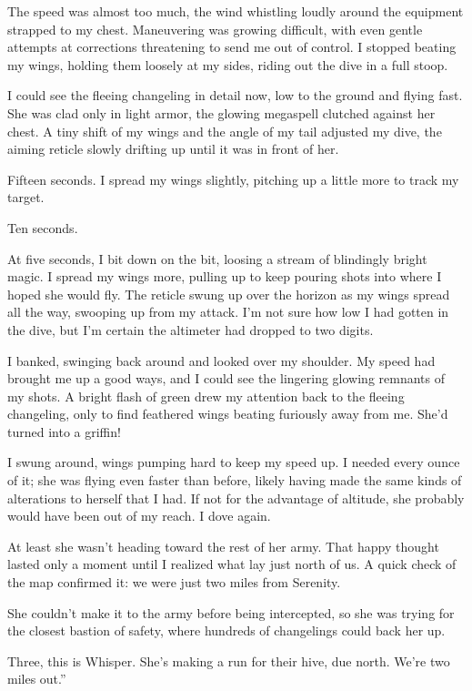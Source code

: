 The speed was almost too much, the wind whistling loudly around the equipment strapped to my chest. Maneuvering was growing difficult, with even gentle attempts at corrections threatening to send me out of control. I stopped beating my wings, holding them loosely at my sides, riding out the dive in a full stoop.

I could see the fleeing changeling in detail now, low to the ground and flying fast. She was clad only in light armor, the glowing megaspell clutched against her chest. A tiny shift of my wings and the angle of my tail adjusted my dive, the aiming reticle slowly drifting up until it was in front of her.

Fifteen seconds. I spread my wings slightly, pitching up a little more to track my target.

Ten seconds.

At five seconds, I bit down on the bit, loosing a stream of blindingly bright magic. I spread my wings more, pulling up to keep pouring shots into where I hoped she would fly. The reticle swung up over the horizon as my wings spread all the way, swooping up from my attack. I’m not sure how low I had gotten in the dive, but I’m certain the altimeter had dropped to two digits.

I banked, swinging back around and looked over my shoulder. My speed had brought me up a good ways, and I could see the lingering glowing remnants of my shots. A bright flash of green drew my attention back to the fleeing changeling, only to find feathered wings beating furiously away from me. She’d turned into a griffin!

I swung around, wings pumping hard to keep my speed up. I needed every ounce of it; she was flying even faster than before, likely having made the same kinds of alterations to herself that I had. If not for the advantage of altitude, she probably would have been out of my reach. I dove again.

At least she wasn’t heading toward the rest of her army. That happy thought lasted only a moment until I realized what lay just north of us. A quick check of the map confirmed it: we were just two miles from Serenity.

She couldn’t make it to the army before being intercepted, so she was trying for the closest bastion of safety, where hundreds of changelings could back her up.

\leavevmode{}Three, this is Whisper. She’s making a run for their hive, due north. We’re two miles out.”

